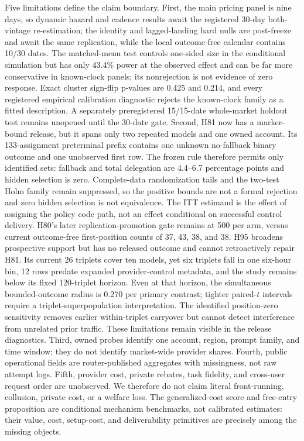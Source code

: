\documentclass[11pt]{article}
\newcommand{\1}{\mathbf{1}}
\begin{document}
Five limitations define the claim boundary.  First, the main pricing panel is nine
days, so dynamic hazard and cadence results await the registered 30-day
both-vintage re-estimation; the identity and lagged-landing hard nulls are
post-freeze and await the same replication, while the local outcome-free calendar
contains 10/30 dates.  The matched-menu test controls one-sided size in the
conditional simulation but has only 43.4\% power at the observed effect and can be
far more conservative in known-clock panels; its nonrejection is not evidence of
zero response.  Exact cluster sign-flip p-values are 0.425 and 0.214, and every
registered empirical calibration diagnostic rejects the known-clock family as a
fitted description.  A separately preregistered 15/15-date whole-market holdout
test remains unopened until the 30-date gate.  Second, H81 now has a
marker-bound release, but it spans only two repeated models and one owned
account.  Its 133-assignment preterminal prefix contains one unknown no-fallback
binary outcome and one unobserved first row.  The frozen rule therefore permits
only identified sets: fallback and total delegation are 4.4--6.7 percentage
points and hidden selection is zero.  Complete-data randomization tails and the
two-test Holm family remain suppressed, so the positive bounds are not a formal
rejection and zero hidden selection is not equivalence.  The ITT estimand is the
effect of assigning the policy code path, not an effect conditional on successful
control delivery.  H80's later replication-promotion gate remains at 500 per
arm, versus current outcome-free first-position counts of 37, 43, 38, and 38.
H95 broadens prospective support but has no released outcome and cannot
retroactively repair H81.  Its current 26 triplets cover ten models, yet six
triplets fall in one six-hour bin, 12 rows predate expanded provider-control
metadata, and the study remains below its fixed 120-triplet horizon.  Even at
that horizon, the simultaneous bounded-outcome radius is 0.270 per primary
contrast; tighter paired-$t$ intervals require a triplet-superpopulation
interpretation.  The identified position-zero sensitivity removes earlier
within-triplet carryover but cannot detect interference from unrelated prior
traffic.  These limitations remain visible in the release diagnostics.  Third,
owned probes identify one
account, region, prompt family, and time window; they do not identify market-wide
provider shares.  Fourth, public operational fields are router-published
aggregates with missingness, not raw attempt logs.  Fifth, provider cost, private
rebates, task fidelity, and cross-user request order are unobserved.  We therefore
do not claim literal front-running, collusion, private cost, or a welfare loss.
The generalized-cost score and free-entry proposition are conditional mechanism
benchmarks, not calibrated estimates: their value, cost, setup-cost, and
deliverability primitives are precisely among the missing objects.
\end{document}
